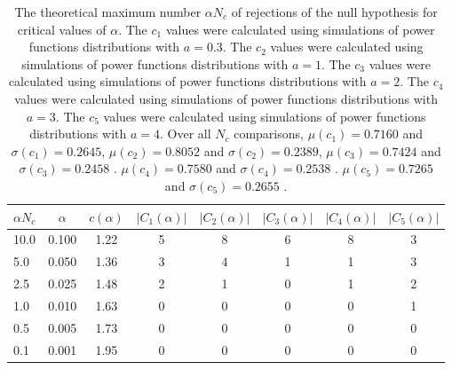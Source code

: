 \begin{table}[h!]
\begin{center}
\begin{tabular}{| l | c | c | c | c | c | c | c |}\hline
$\alpha N_c$ & $\alpha$ & $c(\alpha)$ & $|C_1(\alpha)|$ & $|C_2(\alpha)|$ & $|C_3(\alpha)|$ & $|C_4(\alpha)|$ & $|C_5(\alpha)|$ \\\hline
10.0 & 0.100 & 1.22 & 5 & 8 & 6 & 8 & 3 \\\hline
5.0 & 0.050 & 1.36 & 3 & 4 & 1 & 1 & 3 \\\hline
2.5 & 0.025 & 1.48 & 2 & 1 & 0 & 1 & 2 \\\hline
1.0 & 0.010 & 1.63 & 0 & 0 & 0 & 0 & 1 \\\hline
0.5 & 0.005 & 1.73 & 0 & 0 & 0 & 0 & 0 \\\hline
0.1 & 0.001 & 1.95 & 0 & 0 & 0 & 0 & 0 \\\hline
\end{tabular}
\caption{The theoretical maximum number $\alpha N_c$ of rejections
of the null hypothesis for critical values of $\alpha$.
The $c_1$ values were calculated using simulations of power functions distributions with $a=0.3$.
The $c_2$ values were calculated using simulations of power functions distributions with $a=1$.
The $c_3$ values were calculated using simulations of power functions distributions with $a=2$.
The $c_4$ values were calculated using simulations of power functions distributions with $a=3$.
The $c_5$ values were calculated using simulations of power functions distributions with $a=4$.
Over all $N_c$ comparisons,
 $\mu(c_1)=0.7160$ and $\sigma(c_1)=0.2645$,
 $\mu(c_2)=0.8052$ and $\sigma(c_2)=0.2389$,
 $\mu(c_3)=0.7424$ and $\sigma(c_3)=0.2458$ .
 $\mu(c_4)=0.7580$ and $\sigma(c_4)=0.2538$ .
 $\mu(c_5)=0.7265$ and $\sigma(c_5)=0.2655$ .
}
\end{center}
\end{table}